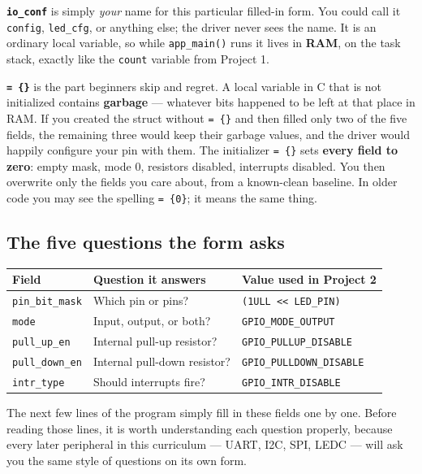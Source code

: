 \documentclass[11pt]{article}
\begin{document}
\textbf{\texttt{io\_conf}} is simply \emph{your} name for this particular filled-in form. You could call it \texttt{config}, \texttt{led\_cfg}, or anything else; the driver never sees the name. It is an ordinary local variable, so while \texttt{app\_main()} runs it lives in \textbf{RAM}, on the task stack, exactly like the \texttt{count} variable from Project 1.

\textbf{\texttt{= \{\}}} is the part beginners skip and regret. A local variable in C that is not initialized contains \textbf{garbage} --- whatever bits happened to be left at that place in RAM. If you created the struct without \texttt{= \{\}} and then filled only two of the five fields, the remaining three would keep their garbage values, and the driver would happily configure your pin with them. The initializer \texttt{= \{\}} sets \textbf{every field to zero}: empty mask, mode 0, resistors disabled, interrupts disabled. You then overwrite only the fields you care about, from a known-clean baseline. In older code you may see the spelling \texttt{= \{0\}}; it means the same thing.

\subsection{The five questions the form asks}

\begin{table}[htbp]
\centering
\renewcommand{\arraystretch}{1.3}
\begin{tabularx}{\textwidth}{@{}l X l@{}}
\toprule
\textbf{Field} & \textbf{Question it answers} & \textbf{Value used in Project 2} \\
\midrule
\texttt{pin\_bit\_mask} & Which pin or pins? & \texttt{(1ULL << LED\_PIN)} \\
\texttt{mode} & Input, output, or both? & \texttt{GPIO\_MODE\_OUTPUT} \\
\texttt{pull\_up\_en} & Internal pull-up resistor? & \texttt{GPIO\_PULLUP\_DISABLE} \\
\texttt{pull\_down\_en} & Internal pull-down resistor? & \texttt{GPIO\_PULLDOWN\_DISABLE} \\
\texttt{intr\_type} & Should interrupts fire? & \texttt{GPIO\_INTR\_DISABLE} \\
\bottomrule
\end{tabularx}
\end{table}

The next few lines of the program simply fill in these fields one by one. Before reading those lines, it is worth understanding each question properly, because every later peripheral in this curriculum --- UART, I2C, SPI, LEDC --- will ask you the same style of questions on its own form.
\end{document}
